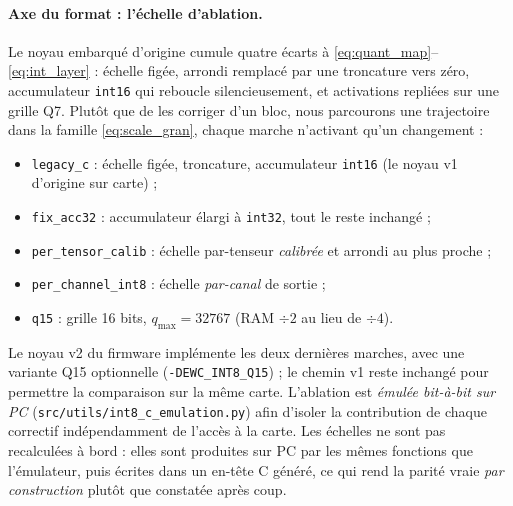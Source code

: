 \paragraph{Axe du format : l'échelle d'ablation.} Le noyau embarqué d'origine cumule quatre écarts à
\eqref{eq:quant_map}--\eqref{eq:int_layer} : échelle figée, arrondi remplacé par une troncature vers
zéro, accumulateur \texttt{int16} qui reboucle silencieusement, et activations repliées sur une grille
Q7. Plutôt que de les corriger d'un bloc, nous parcourons une trajectoire dans la famille
\eqref{eq:scale_gran}, chaque marche n'activant qu'un changement :
\begin{itemize}
  \item \texttt{legacy\_c} : échelle figée, troncature, accumulateur \texttt{int16} (le noyau v1
        d'origine sur carte) ;
  \item \texttt{fix\_acc32} : accumulateur élargi à \texttt{int32}, tout le reste inchangé ;
  \item \texttt{per\_tensor\_calib} : échelle par-tenseur \emph{calibrée} et arrondi au plus proche ;
  \item \texttt{per\_channel\_int8} : échelle \emph{par-canal} de sortie ;
  \item \texttt{q15} : grille 16 bits, $q_{\max} = 32767$ (RAM $\div 2$ au lieu de $\div 4$).
\end{itemize}
Le noyau v2 du firmware implémente les deux dernières marches, avec une variante Q15 optionnelle
(\texttt{-DEWC\_INT8\_Q15}) ; le chemin v1 reste inchangé pour permettre la comparaison sur la même
carte. L'ablation est \emph{émulée bit-à-bit sur PC} (\texttt{src/utils/int8\_c\_emulation.py}) afin
d'isoler la contribution de chaque correctif indépendamment de l'accès à la carte. Les échelles ne sont
pas recalculées à bord : elles sont produites sur PC par les mêmes fonctions que l'émulateur, puis
écrites dans un en-tête C généré, ce qui rend la parité vraie \emph{par construction} plutôt que
constatée après coup.

